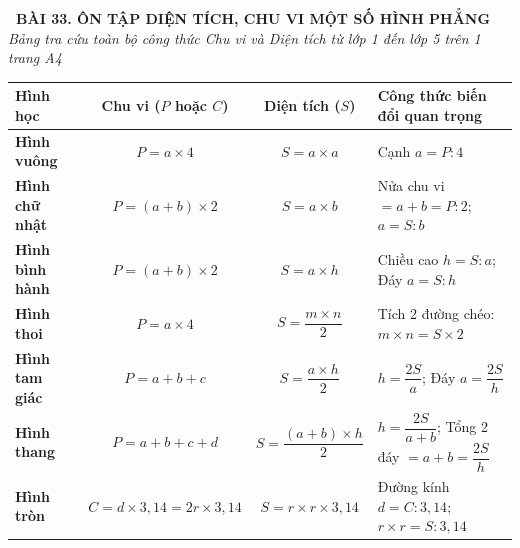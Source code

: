 \documentclass[14pt,a4paper,oneside]{extbook}
\begin{document}
\noindent
\begin{tcolorbox}[
  enhanced,
  colback=teal!8!white,
  colframe=teal!80!black,
  arc=3mm,
  boxrule=1.1pt,
  width=\linewidth,
  halign=center,
  top=2.2mm, bottom=2.2mm,
  left=3mm, right=3mm,
  drop fuzzy shadow
]
  {\large\bfseries\color{teal!95!black}\faBookmark\ BÀI 33. ÔN TẬP DIỆN TÍCH, CHU VI MỘT SỐ HÌNH PHẲNG}\\[2pt]
  {\scriptsize\color{black!75}\itshape Bảng tra cứu toàn bộ công thức Chu vi và Diện tích từ lớp 1 đến lớp 5 trên 1 trang A4}
\end{tcolorbox}

\vspace{3.2mm}
\noindent
\begin{tcolorbox}[
  enhanced,
  title={\footnotesize\bfseries\color{white}\faTable\ 1. Bảng tra cứu toàn diện công thức Chu vi và Diện tích},
  colback=blue!2!white,
  colframe=blue!75!black,
  arc=2.5mm, boxrule=0.8pt, top=1.8mm, bottom=1.8mm, left=2mm, right=2mm
]
  \scriptsize
  \centering
  \begin{tabular}{|l|c|c|l|}
    \hline
    \textbf{Hình học} & \textbf{Chu vi ($P$ hoặc $C$)} & \textbf{Diện tích ($S$)} & \textbf{Công thức biến đổi quan trọng} \\ \hline
    \textbf{Hình vuông} & $P = a \times 4$ & $S = a \times a$ & Cạnh $a = P : 4$ \\ \hline
    \textbf{Hình chữ nhật} & $P = (a + b) \times 2$ & $S = a \times b$ & Nửa chu vi $= a + b = P : 2$; $a = S : b$ \\ \hline
    \textbf{Hình bình hành} & $P = (a + b) \times 2$ & $S = a \times h$ & Chiều cao $h = S : a$; Đáy $a = S : h$ \\ \hline
    \textbf{Hình thoi} & $P = a \times 4$ & $S = \dfrac{m \times n}{2}$ & Tích 2 đường chéo: $m \times n = S \times 2$ \\ \hline
    \textbf{Hình tam giác} & $P = a + b + c$ & $S = \dfrac{a \times h}{2}$ & $h = \dfrac{2S}{a}$; Đáy $a = \dfrac{2S}{h}$ \\ \hline
    \textbf{Hình thang} & $P = a + b + c + d$ & $S = \dfrac{(a + b) \times h}{2}$ & $h = \dfrac{2S}{a + b}$; Tổng 2 đáy $= a + b = \dfrac{2S}{h}$ \\ \hline
    \textbf{Hình tròn} & $C = d \times 3,14 = 2r \times 3,14$ & $S = r \times r \times 3,14$ & Đường kính $d = C : 3,14$; $r \times r = S : 3,14$ \\ \hline
  \end{tabular}
\end{tcolorbox}
\end{document}
